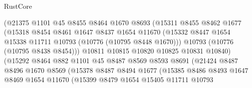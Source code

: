 \begin{lexlean}{RustCore}
\begin{coremodule}
                            (@21375
                              @1101
                              @45
                              @8455
                              @8464
                              @1670
                              @8693
                              (@15311
                                @8455
                                @8462
                                @1677
                                (@15318
                                  @8454
                                  @8461
                                  @1647
                                  @8437
                                  @1654
                                  @11670
                                  (@15332
                                    @8447
                                    @1654
                                    @15338
                                    @11711
                                    @10793
                                    (@10776 (@10795 @8448 @1670)))
                                  @10793
                                  (@10776 (@10795 @8438 @8454)))
                                @10811
                                @10815
                                @10820
                                @10825
                                @10831
                                @10840)
                              (@15292
                                @8464
                                @882
                                @1101
                                @45
                                @8487
                                @8569
                                @8593
                                @8691
                                (@21424
                                  @8487
                                  @8496
                                  @1670
                                  @8569
                                  (@15378
                                    @8487
                                    @8494
                                    @1677
                                    (@15385
                                      @8486
                                      @8493
                                      @1647
                                      @8469
                                      @1654
                                      @11670
                                      (@15399
                                        @8479
                                        @1654
                                        @15405
                                        @11711
                                        @10793

\end{coremodule}
\end{lexlean}
